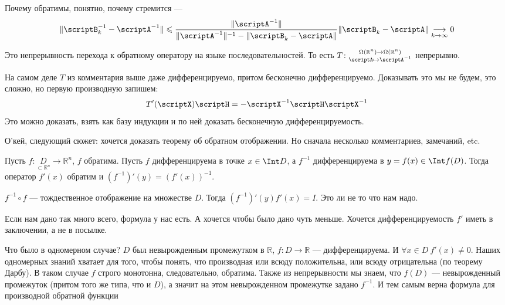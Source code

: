 \documentclass{article}
\begin{document}
\begin{itemize}
        \begin{Proof}
            Почему обратимы, понятно, почему стремится ---
            $$
            \|\scriptB^{-1}_k-\scriptA^{-1}\|\leqslant\frac{\|\scriptA^{-1}\|}{\|\scriptA^{-1}\|^{-1}-\|\scriptB_k-\scriptA\|}\|\scriptB_k-\scriptA\|\underset{k\to\infty}\longrightarrow0
            $$
        \end{Proof}
        \begin{Comment}
            Это непрерывность перехода к обратному оператору на языке последовательностей. То есть $T\colon\substack{\Omega(\mathbb R^n)\to\Omega(\mathbb R^n)\\\scriptA\mapsto\scriptA^{-1}}$ непрерывно.
        \end{Comment}
        \begin{Comment}
            На самом деле $T$ из комментария выше даже дифференцируемо, притом бесконечно дифференцируемо. Доказывать это мы не будем, это сложно, но первую производную запишем:
            $$
            T'(\scriptX)\scriptH=-\scriptX^{-1}\scriptH\scriptX^{-1}
            $$
            Это можно доказать, взять как базу индукции и по ней доказать бесконечную дифференцируемость.
        \end{Comment}
        \begin{Comment}
            О'кей, следующий сюжет: хочется доказать теорему об обратном отображении. Но сначала несколько комментариев, замечаний, etc.
        \end{Comment}
        \thm Пусть $f\colon\underset{\subset\mathbb R^n}D\to\mathbb R^n$, $f$ обратима. Пусть $f$ дифференцируема в точке $x\in\Int D$, а $f^{-1}$ дифференцируема в $y=f(x)\in\Int f(D)$. Тогда оператор $f'(x)$ обратим и $(f^{-1})'(y)=(f'(x))^{-1}$.
        \begin{Proof}
            $f^{-1}\circ f$ --- тождественное отображение на множестве $D$. Тогда $(f^{-1})'(y)f'(x)=I$. Это ли не то что нам надо.
        \end{Proof}
        \begin{Comment}
            Если нам дано так много всего, формула у нас есть. А хочется чтобы было дано чуть меньше. Хочется дифференцируемость $f'$ иметь в заключении, а не в посылке.
        \end{Comment}
        \begin{Comment}
            Что было в одномерном случае? $D$ был невырожденным промежутком в $\mathbb R$, $f\colon D\to\mathbb R$ --- дифференцируема. И $\forall x\in D~f'(x)\neq0$. Наших одномерных знаний хватает для того, чтобы понять, что производная или всюду положительна, или всюду отрицательна (по теорему Дарбу). В таком случае $f$ строго монотонна, следовательно, обратима. Также из непрерывности мы знаем, что $f(D)$ --- невырожденный промежуток (притом того же типа, что и $D$), а значит на этом невырожденном промежутке задано $f^{-1}$. И тем самым верна формула для производной обратной функции

\end{Comment}
\end{itemize}
\end{document}
